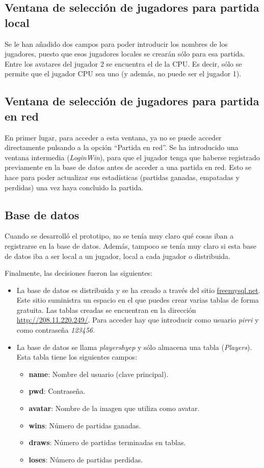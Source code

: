 \subsection{Ventana de selección de jugadores para partida local}
Se le han añadido dos campos para poder introducir los nombres de los
jugadores, puesto que esos jugadores locales se crearán sólo para esa partida.
Entre los avatares del jugador 2 se encuentra el de la CPU. Es decir, sólo
se permite que el jugador CPU sea uno (y además, no puede ser el jugador 1).

\subsection{Ventana de selección de jugadores para partida en red}
En primer lugar, para acceder a esta ventana, ya no se puede acceder
directamente pulsando a la opción ``Partida en red''. Se ha introducido una
ventana intermedia (\emph{LoginWin}), para que el jugador tenga que haberse
registrado previamente en la base de datos antes de acceder a una partida
en red. Esto se hace para poder actualizar sus estadísticas (partidas ganadas,
empatadas y perdidas) una vez haya concluido la partida.

\subsection{Base de datos}
Cuando se desarrolló el prototipo, no se tenía muy claro qué cosas iban a
registrarse en la base de datos. Además, tampoco se tenía muy claro si esta
base de datos iba a ser local a un jugador, local a cada jugador o
distribuida.

Finalmente, las decisiones fueron las siguientes:
\begin{itemize}
\item La base de datos es distribuida y se ha creado a través del sitio
\url{freemysql.net}. Este sitio suministra un espacio en el que puedes crear
varias tablas de forma gratuita. Las tablas creadas se encuentran en la
dirección \url{http://208.11.220.249/}. Para acceder hay que introducir como
usuario \emph{pirri} y como contraseña \emph{123456}.
\item La base de datos se llama \emph{playershyep} y sólo almacena una tabla
(\emph{Players}). Esta tabla tiene los siguientes campos:
\begin{itemize}
\item \textbf{name}: Nombre del usuario (clave principal).
\item \textbf{pwd}: Contraseña.
\item \textbf{avatar}: Nombre de la imagen que utiliza como avatar.
\item \textbf{wins}: Número de partidas ganadas.
\item \textbf{draws}: Número de partidas terminadas en tablas.
\item \textbf{loses}: Número de partidas perdidas.
\end{itemize}
\end{itemize}

